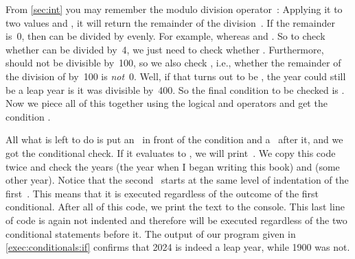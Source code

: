 \begin{sloppypar}%
From \cref{sec:int} you may remember the modulo division operator~\pythonilIdx{\%}:
Applying it to two values  and , it will return the remainder of the division~\pythonIdx{//}.
If the remainder is~0, then  can be divided by  evenly.
For example,  whereas  and .
So to check whether  can be divided by~4, we just need to check whether .
Furthermore,  should not be divisible by~100, so we also check , i.e., whether the remainder of the division of  by~100 is \emph{not}~0.
Well, if that turns out to be , the year could still be a leap year is it was divisible by~400.
So the final condition to be checked is .
Now we piece all of this together using the logical  and  operators and get the condition .
\end{sloppypar}%
%
All what is left to do is put an~ in front of the condition and a~\pythonilIdx{:} after it, and we got the conditional check.
If it evaluates to , we will print~.
We copy this code twice and check the years  (the year when I began writing this book) and  (some other year).
Notice that the second~ starts at the same level of indentation of the first~.
This means that it is executed regardless of the outcome of the first conditional.
After all of this code, we print the text  to the console.
This last line of code is again not indented and therefore will be executed regardless of the two conditional statements before it.
The output of our program given in \cref{exec:conditionals:if} confirms that 2024 is indeed a leap year, while 1900 was not.%
%
\FloatBarrier%
\endhsection%
%
%
%
%
%
%

